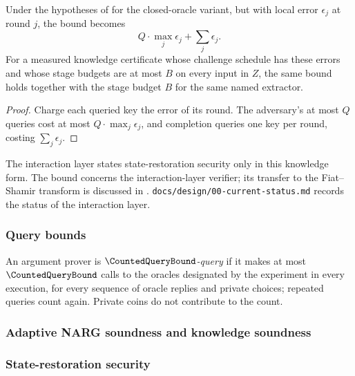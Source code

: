 \begin{theorem}
    \label{thm:sr_knowledge_soundness_nonuniform}
    Under the hypotheses of  for the closed-oracle variant, but
    with local error \(\epsilon_j\) at round \(j\), the bound becomes
    \begin{equation*}
        Q \cdot \max_j \epsilon_j + \sum_{j} \epsilon_j .
    \end{equation*}
    For a measured knowledge certificate whose challenge schedule has these errors and whose stage
    budgets are at most \(B\) on every input in \(Z\), the same bound holds together with the stage
    budget \(B\) for the same named extractor.
    \leanok
\end{theorem}
\begin{proof}
    \leanok
    Charge each queried key the error of its round. The adversary's at most \(Q\) queries cost at
    most \(Q \cdot \max_j \epsilon_j\), and completion queries one key per round, costing
    \(\sum_j \epsilon_j\).
\end{proof}

The interaction layer states state-restoration security only in this knowledge form. The bound concerns the
interaction-layer verifier; its transfer to the Fiat--Shamir transform is discussed in
. \texttt{docs/design/00-current-status.md} records the status of
the interaction layer.

\subsubsection{Query bounds}

\begin{definition}
  \label{def:counted_queries}
An argument prover is \emph{\(\CountedQueryBound\)-query} if it makes at most   \(\CountedQueryBound\) calls to the oracles designated by the experiment in every   execution, for every sequence of oracle replies and private choices; repeated   queries count again. Private coins do not contribute to the count.
  \leanok
\end{definition}

\subsubsection{Adaptive NARG soundness and knowledge soundness}



\subsubsection{State-restoration security}


